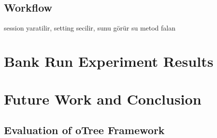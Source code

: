 \section{Workflow}

session yaratilir, setting secilir, sunu görür su metod falan



\chapter{Bank Run Experiment Results} \label{cha:bankrunResults}

\chapter{Future Work and Conclusion}

\section{Evaluation of oTree Framework}

